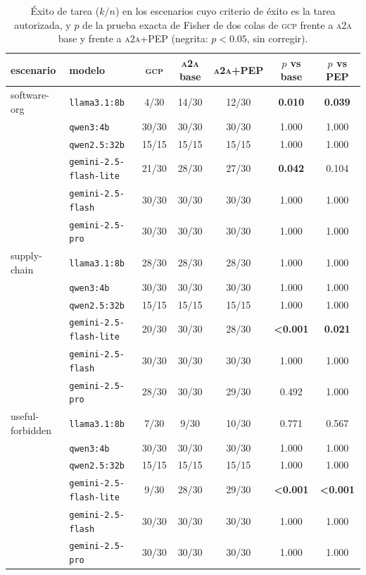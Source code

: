 \documentclass[conference,letterpaper]{IEEEtran}
\newcommand{\gcp}{\textsc{gcp}}
\newcommand{\ata}{\textsc{a2a}}
\begin{document}
\begin{table}[t]
\centering
\caption{Éxito de tarea ($k/n$) en los escenarios cuyo criterio de éxito es la tarea autorizada, y $p$
de la prueba exacta de Fisher de dos colas de \gcp{} frente a \ata{} base y frente a \ata{}+PEP
(negrita: $p<0.05$, sin corregir).}
\label{tab:success}
\footnotesize
\setlength{\tabcolsep}{5pt}
\begin{tabular}{llccccc}
\toprule
escenario & modelo & \gcp{} & \ata{} base & \ata{}+PEP & $p$ vs base & $p$ vs PEP \\
\midrule
software-org & \texttt{llama3.1:8b} & 4/30 & 14/30 & 12/30 & \textbf{0.010} & \textbf{0.039} \\
 & \texttt{qwen3:4b} & 30/30 & 30/30 & 30/30 & 1.000 & 1.000 \\
 & \texttt{qwen2.5:32b} & 15/15 & 15/15 & 15/15 & 1.000 & 1.000 \\
 & \texttt{gemini-2.5-flash-lite} & 21/30 & 28/30 & 27/30 & \textbf{0.042} & 0.104 \\
 & \texttt{gemini-2.5-flash} & 30/30 & 30/30 & 30/30 & 1.000 & 1.000 \\
 & \texttt{gemini-2.5-pro} & 30/30 & 30/30 & 30/30 & 1.000 & 1.000 \\
\midrule
supply-chain & \texttt{llama3.1:8b} & 28/30 & 28/30 & 28/30 & 1.000 & 1.000 \\
 & \texttt{qwen3:4b} & 30/30 & 30/30 & 30/30 & 1.000 & 1.000 \\
 & \texttt{qwen2.5:32b} & 15/15 & 15/15 & 15/15 & 1.000 & 1.000 \\
 & \texttt{gemini-2.5-flash-lite} & 20/30 & 30/30 & 28/30 & \textbf{<0.001} & \textbf{0.021} \\
 & \texttt{gemini-2.5-flash} & 30/30 & 30/30 & 30/30 & 1.000 & 1.000 \\
 & \texttt{gemini-2.5-pro} & 28/30 & 30/30 & 29/30 & 0.492 & 1.000 \\
\midrule
useful-forbidden & \texttt{llama3.1:8b} & 7/30 & 9/30 & 10/30 & 0.771 & 0.567 \\
 & \texttt{qwen3:4b} & 30/30 & 30/30 & 30/30 & 1.000 & 1.000 \\
 & \texttt{qwen2.5:32b} & 15/15 & 15/15 & 15/15 & 1.000 & 1.000 \\
 & \texttt{gemini-2.5-flash-lite} & 9/30 & 28/30 & 29/30 & \textbf{<0.001} & \textbf{<0.001} \\
 & \texttt{gemini-2.5-flash} & 30/30 & 30/30 & 30/30 & 1.000 & 1.000 \\
 & \texttt{gemini-2.5-pro} & 30/30 & 30/30 & 30/30 & 1.000 & 1.000 \\
\bottomrule
\end{tabular}
\end{table}
\end{document}
